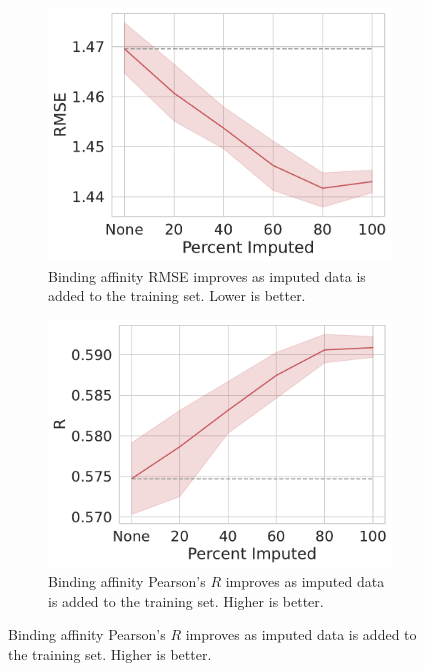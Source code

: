 \documentclass[journal=jcim,manuscript=article]{achemso}
\begin{document}
\begin{figure}[tbph]
    \centering
    \begin{subfigure}[t]{0.48\textwidth}
        \centering
        \includegraphics[width=\linewidth]{figures/MedGOEns_addingImpRMSE.pdf}
        \caption{Binding affinity RMSE improves as imputed data is added to the training set. Lower is better.}
    \end{subfigure}
    \hfill
    \begin{subfigure}[t]{0.48\textwidth}
        \centering
        \includegraphics[width=\linewidth]{figures/MedGOEns_addingImpR.pdf}
        \caption{Binding affinity Pearson's $R$ improves as imputed data is added to the training set. Higher is better.}
    \end{subfigure}


\end{figure}
\end{document}
